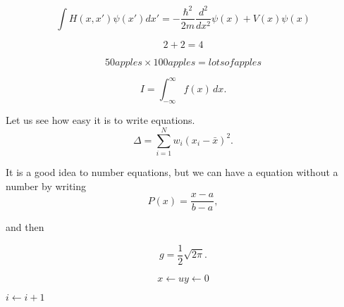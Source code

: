 \documentclass{article}
\begin{document}
{\Large
\begin{displaymath}
 \int H(x,x')\psi(x')dx' = -\frac{\hbar^2}{2m}\frac{d^2}{dx^2}
                          \psi(x)+V(x)\psi(x)
\end{displaymath}

\begin{equation}
 2 + 2 = 4
\end{equation}

\begin{equation}
  50 apples \times 100 apples = lots of apples 
\end{equation}

\begin{equation}
 I = \! \int_{-\infty}^\infty f(x)\,dx \label{eq:fine}.
\end{equation}


Let us see how easy it is to write equations.
\begin{equation}
 \Delta =\sum_{i=1}^N w_i (x_i - \bar{x})^2 .
\end{equation}

It is a good idea to number equations, but we can have a
equation without a number by writing
\begin{equation}
 P(x) = \frac{x - a}{b - a} , \nonumber
\end{equation}

and then 

\begin{equation}
 g = \frac{1}{2} \sqrt{2\pi} . \nonumber
\end{equation}

\begin{equation}
  x \longleftarrow u
  y \longleftarrow 0
\end{equation}

\begin{algorithmic}

    \STATE $i \gets i + 1$
  \ENDFOR 
\end{algorithmic}

}
\end{document}
